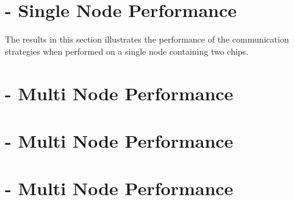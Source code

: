 \section{ - Single Node Performance}
The results in this section illustrates the performance of the communication strategies when performed on a single node containing two \phantom{a}chips.  

\medskip

\section{ - Multi Node Performance}



\section{\romeq{} - Multi Node Performance}


\section{\fpgaq{} - Multi Node Performance}






